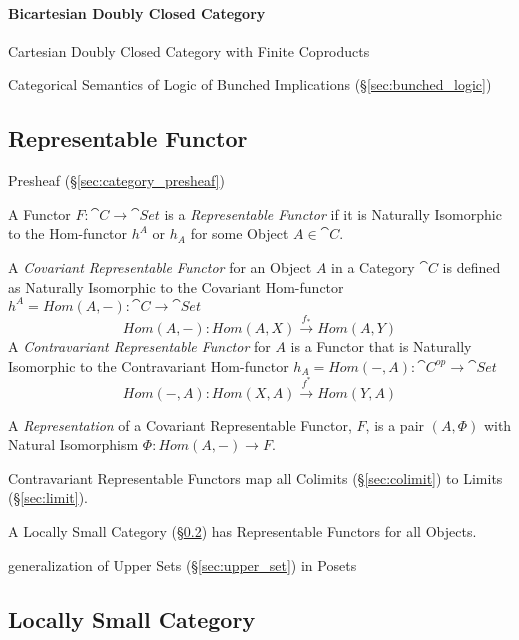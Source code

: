 \paragraph{Bicartesian Doubly Closed Category}
\label{sec:bicartesian_doubly_closed}\hfill

Cartesian Doubly Closed Category with Finite Coproducts

Categorical Semantics of Logic of Bunched Implications
(\S\ref{sec:bunched_logic})



\subsection{Representable Functor}\label{sec:representable_functor}

Presheaf (\S\ref{sec:category_presheaf})

A Functor $F : \cat{C} \rightarrow \cat{Set}$ is a
\emph{Representable Functor} if it is Naturally Isomorphic to the
Hom-functor $h^A$ or $h_A$ for some Object $A \in \cat{C}$.

A \emph{Covariant Representable Functor} for an Object $A$ in a
Category $\cat{C}$ is defined as Naturally Isomorphic to the
Covariant Hom-functor $h^A = Hom(A,-) : \cat{C} \rightarrow
\cat{Set}$
\[
  Hom(A,-) : Hom(A,X) \xrightarrow{f_*} Hom(A,Y)
\]
A \emph{Contravariant Representable Functor} for $A$ is a Functor that
is Naturally Isomorphic to the Contravariant Hom-functor $h_A =
Hom(-,A) : \cat{C^{op}} \rightarrow \cat{Set}$
\[
  Hom(-,A) : Hom(X,A) \xrightarrow{f^*} Hom(Y,A)
\]

A \emph{Representation} of a Covariant Representable Functor, $F$, is
a pair $(A, \Phi)$ with Natural Isomorphism $\Phi : Hom(A,-)
\rightarrow F$.

Contravariant Representable Functors map all Colimits
(\S\ref{sec:colimit}) to Limits (\S\ref{sec:limit}).

A Locally Small Category (\S\ref{sec:locally_small}) has Representable
Functors for all Objects.

generalization of Upper Sets (\S\ref{sec:upper_set}) in Posets



\subsection{Locally Small Category}\label{sec:locally_small}

